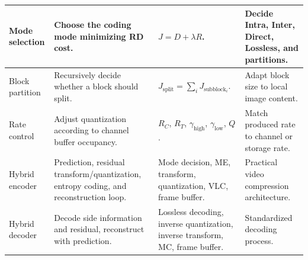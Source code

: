 \begin{center}
\begin{tabular}{|l|l|l|l|}
Mode selection & Choose the coding mode minimizing RD cost. & $J = D + \lambda R$. & Decide Intra, Inter, Direct, Lossless, and partitions. \\ \hline
Block partition & Recursively decide whether a block should split. & $J_{\text{split}} = \sum_i J_{\text{subblock}_i}$. & Adapt block size to local image content. \\ \hline
Rate control & Adjust quantization according to channel buffer occupancy. & $R_C$, $R_T$, $\gamma_{\text{high}}$, $\gamma_{\text{low}}$, $Q$. & Match produced rate to channel or storage rate. \\ \hline
Hybrid encoder & Prediction, residual transform/quantization, entropy coding, and reconstruction loop. & Mode decision, ME, transform, quantization, VLC, frame buffer. & Practical video compression architecture. \\ \hline
Hybrid decoder & Decode side information and residual, reconstruct with prediction. & Lossless decoding, inverse quantization, inverse transform, MC, frame buffer. & Standardized decoding process. \\ \hline
\end{tabular}
\end{center}

